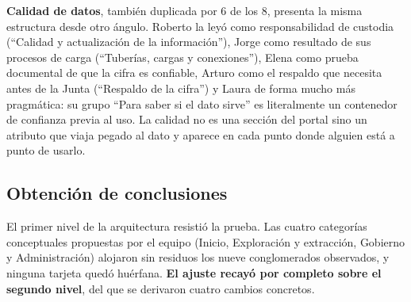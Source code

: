 \textbf{Calidad de datos}, también duplicada por 6 de los 8, presenta la misma estructura desde otro ángulo. Roberto la leyó como responsabilidad de custodia (``Calidad y actualización de la información''), Jorge como resultado de sus procesos de carga (``Tuberías, cargas y conexiones''), Elena como prueba documental de que la cifra es confiable, Arturo como el respaldo que necesita antes de la Junta (``Respaldo de la cifra'') y Laura de forma mucho más pragmática: su grupo ``Para saber si el dato sirve'' es literalmente un contenedor de confianza previa al uso. La calidad no es una sección del portal sino un atributo que viaja pegado al dato y aparece en cada punto donde alguien está a punto de usarlo.

\subsection{Obtención de conclusiones}
El primer nivel de la arquitectura resistió la prueba. Las cuatro categorías conceptuales propuestas por el equipo (Inicio, Exploración y extracción, Gobierno y Administración) alojaron sin residuos los nueve conglomerados observados, y ninguna tarjeta quedó huérfana. \textbf{El ajuste recayó por completo sobre el segundo nivel}, del que se derivaron cuatro cambios concretos.

